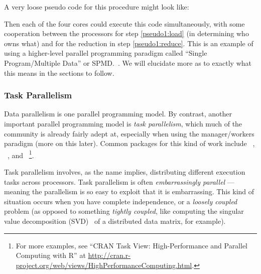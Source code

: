 A very loose pseudo code for this procedure might look like:


Then each of the four cores could execute this code simultaneously, with some
cooperation between the processors for step \ref{pseudo1:load} (in determining
who owns what) and for the reduction in step \ref{pseudo1:reduce}. This is
an example of using a higher-level parallel programming paradigm called
``Single Program/Multiple Data''
or SPMD.~.  We will elucidate more as to exactly what 
this means in the sections to follow.



\subsubsection{Task Parallelism}

Data parallelism is one parallel programming model. By contrast, another
important parallel programming model is \emph{task 
parallelism}, which much of the 
 community is already fairly adept at, especially when using the 
manager/workers paradigm
(more on this later).  Common packages for this kind of work include 
~\citep{Tierney2012}, 
~\citep{parallel}, and 
~\citep{Yu2002}\footnote{For more examples, 
see ``CRAN Task View: High-Performance and Parallel Computing with R'' at 
\url{http://cran.r-project.org/web/views/HighPerformanceComputing.html}.}.

Task parallelism involves, as the name implies, distributing different execution
tasks across processors. Task parallelism is often \emph{embarrassingly 
parallel} --- meaning the 
parallelism is so easy to exploit that it is embarrassing. This kind of 
situation occurs when you have complete independence, or a \emph{loosely 
coupled} problem (as opposed to something 
\emph{tightly coupled}, like computing the 
singular value decomposition (SVD)~ of a distributed data matrix, for 
example).  

